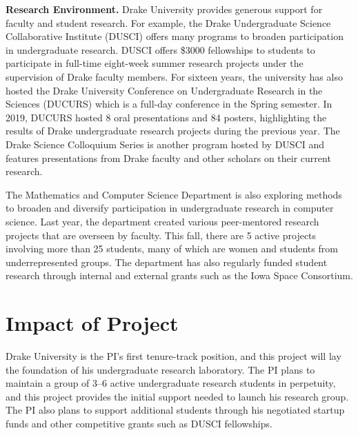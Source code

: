 \documentclass[11pt]{article}
\begin{document}
    \textbf{Research Environment.}
    Drake University provides generous support for faculty and student research.
    For example, the Drake Undergraduate Science Collaborative Institute (DUSCI) offers many programs to broaden participation in undergraduate research.
    DUSCI offers \$3000 fellowships to students to participate in full-time eight-week summer research projects under the supervision of Drake faculty members.
    For sixteen years, the university has also hosted the Drake University Conference on Undergraduate Research in the Sciences (DUCURS) which is a full-day conference in the Spring semester.
    In 2019, DUCURS hosted 8 oral presentations and 84 posters, highlighting the results of Drake undergraduate research projects during the previous year.
    The Drake Science Colloquium Series is another program hosted by DUSCI and features presentations from Drake faculty and other scholars on their current research.

    The Mathematics and Computer Science Department is also exploring methods to broaden and diversify participation in undergraduate research in computer science.
    Last year,
    the department created various peer-mentored research projects that are overseen by faculty.
    This fall, there are 5 active projects involving more than 25 students, many of which are women and students from underrepresented groups.
    The department has also regularly funded student research through internal and external grants such as the Iowa Space Consortium.

    \section{Impact of Project}
    Drake University is the PI's first tenure-track position, and this project will lay the foundation of his undergraduate research laboratory.
    The PI plans to maintain a group of 3--6 active undergraduate research students in perpetuity, and this project provides the initial support needed to launch his research group.
    The PI also plans to support additional students through his negotiated startup funds and other competitive grants such as DUSCI fellowships.
\end{document}

